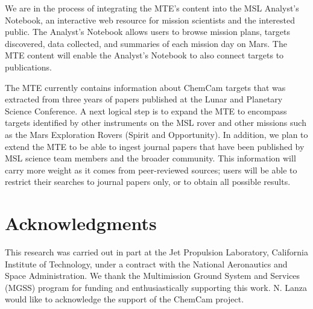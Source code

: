 \documentclass[letterpaper]{article} %
\begin{document}
We are in the process of integrating the MTE's content into the MSL
Analyst's Notebook, an interactive web resource for mission scientists
and the interested public.  The Analyst's Notebook allows users to
browse mission plans, targets discovered, data collected, and
summaries of each mission day on Mars.  The MTE content will enable
the Analyst's Notebook to also connect targets to publications.

The MTE currently contains information about ChemCam targets that was
extracted from three years of papers published at the Lunar and
Planetary Science Conference.  A next logical step is to expand the
MTE to encompass targets identified by other instruments on the MSL
rover and other missions such as the Mars Exploration Rovers (Spirit
and Opportunity).  In addition, we plan to extend the MTE to be able
to ingest journal papers that have been published by MSL science team
members and the broader community.  This information will carry more
weight as it comes from peer-reviewed sources; users will be able to
restrict their searches to journal papers only, or to obtain all
possible results.

\section{Acknowledgments}
This research was carried out in part at the Jet Propulsion Laboratory,
California Institute of Technology, under a contract with the National
Aeronautics and Space Administration.  
We thank the Multimission Ground System and Services (MGSS)
program for funding and enthusiastically supporting this work.
N. Lanza would like to acknowledge the support of the ChemCam
project. 



\end{document}
